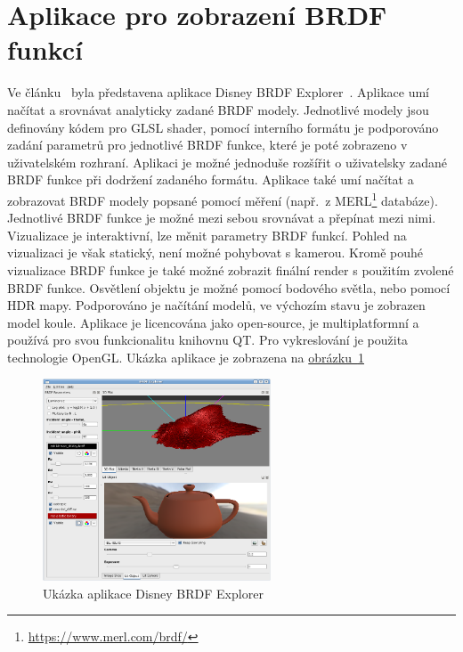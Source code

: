 \documentclass[czech,master]{diploma}
\newcommand{\appH}{6cm}
\begin{document}
\section{Aplikace pro zobrazení BRDF funkcí}
Ve článku~\cite{DisneyBRDF} byla představena aplikace Disney BRDF Explorer~\cite{sourceDisneyBRDF}. Aplikace umí načítat a srovnávat analyticky zadané BRDF modely. Jednotlivé modely jsou definovány kódem pro GLSL shader, pomocí interního formátu je podporováno zadání parametrů pro jednotlivé BRDF funkce, které je poté zobrazeno v uživatelském rozhraní. Aplikaci je možné jednoduše rozšířit o uživatelsky zadané BRDF funkce při dodržení zadaného formátu. Aplikace také umí načítat a zobrazovat BRDF modely popsané pomocí měření (např.\ z MERL\footnote{\url{https://www.merl.com/brdf/}} databáze). Jednotlivé BRDF funkce je možné mezi sebou srovnávat a přepínat mezi nimi. Vizualizace je interaktivní, lze měnit parametry BRDF funkcí. Pohled na vizualizaci je však statický, není možné pohybovat s kamerou. Kromě pouhé vizualizace BRDF funkce je také možné zobrazit finální render s použitím zvolené BRDF funkce. Osvětlení objektu je možné pomocí bodového světla, nebo pomocí HDR mapy. Podporováno je načítání modelů, ve výchozím stavu je zobrazen model koule. Aplikace je licencována jako open-source, je multiplatformní a používá pro svou funkcionalitu knihovnu QT\@. Pro vykreslování je použita technologie OpenGL\@. Ukázka aplikace je zobrazena na \hyperref[fig:disneyBrdfApp]{obrázku~\ref{fig:disneyBrdfApp}}\par

\begin{figure}[ht]
  \centering
  \includegraphics[height=\appH]{Figures/disneyBRDFApp.png}
  \caption[Ukázka aplikace Disney BRDF Explorer]{Ukázka aplikace Disney BRDF Explorer~\cite{DisneyBRDF}}%
  \label{fig:disneyBrdfApp}%
\end{figure}
\end{document}
